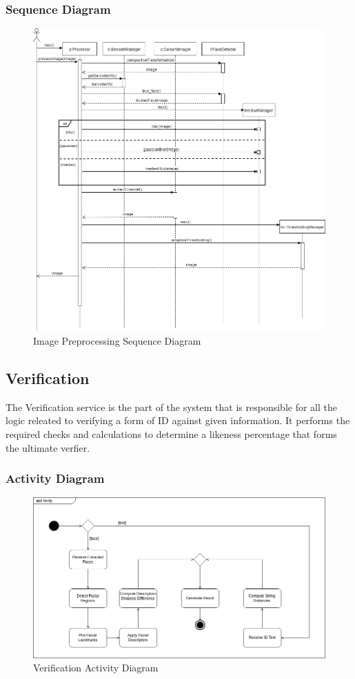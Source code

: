 \documentclass{article}
\begin{document}
\subsubsection{Sequence Diagram}
\begin{figure}[H]
	    \centering
	    \includegraphics[scale=0.5]{img/image_processing_sequence.png}
	    \caption{Image Preprocessing Sequence Diagram}
	 \end{figure}
	 \pagebreak
	 
\subsection{Verification}
The Verification service is the part of the system that is responsible for all the logic releated to verifying a form of ID against given information. It performs the required checks and calculations to determine a likeness percentage that forms the ultimate verfier.
\subsubsection{Activity Diagram}
	\begin{figure}[H]
	    \centering
	    \includegraphics[scale=0.5]{img/verify_activity.png}
	    \caption{Verification Activity Diagram}
	 \end{figure}
	 \pagebreak
\end{document}
